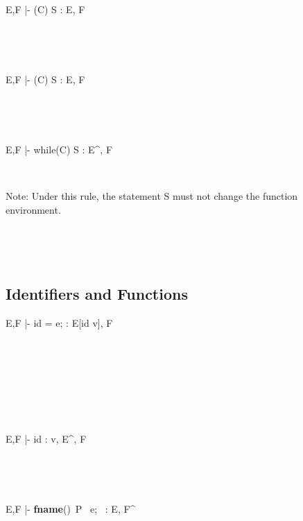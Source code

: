 \documentclass[12pt,letterpaper]{article}
\begin{document}
\ 

\ 

		   {E,F |- (C)  S  : E, F}
		   
\ 

\ 


		   {E,F |- (C)  S  : E, F}
		   
		   
\

\
 


		   {E,F |- {while}(C)  S  : E^{\prime\prime}, F}	  
		
\
   
Note: Under this rule, the statement S must not change the function environment.


\ 

\

\subsection{Identifiers and Functions}

		   {E,F |- id = e; : E[id \leftarrow v], F}
		   
		   
\ 

\ 


		   
		   
\ 

\ 

		   {E,F |- id : v, E^\prime, F}
		   
\

\

		   
{E,F |-  \textbf{fname}()\ P\  e;\  : E, F^\prime}
		   
\

\
\end{document}
